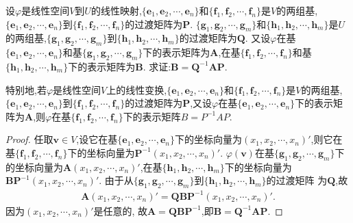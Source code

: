 \documentclass[../../main.tex]{subfiles}%
\begin{document}
\begin{proposition}\label{proposition:线性映射与过渡矩阵}
设\(\varphi\)是线性空间\(V\)到\(U\)的线性映射,\(\{\boldsymbol{e}_1,\boldsymbol{e}_2,\cdots,\boldsymbol{e}_n\}\)和\(\{\boldsymbol{f}_1,\boldsymbol{f}_2,\cdots,\boldsymbol{f}_n\}\)是\(V\)的两组基,\(\{\boldsymbol{e}_1,\boldsymbol{e}_2,\cdots,\boldsymbol{e}_n\}\)到\(\{\boldsymbol{f}_1,\boldsymbol{f}_2,\cdots,\boldsymbol{f}_n\}\)的过渡矩阵为\(\boldsymbol{P}\). \(\{\boldsymbol{g}_1,\boldsymbol{g}_2,\cdots,\boldsymbol{g}_m\}\)和\(\{\boldsymbol{h}_1,\boldsymbol{h}_2,\cdots,\boldsymbol{h}_m\}\)是\(U\)的两组基,\(\{\boldsymbol{g}_1,\boldsymbol{g}_2,\cdots,\boldsymbol{g}_m\}\)到\(\{\boldsymbol{h}_1,\boldsymbol{h}_2,\cdots,\boldsymbol{h}_m\}\)的过渡矩阵为\(\boldsymbol{Q}\). 又设\(\varphi\)在基\(\{\boldsymbol{e}_1,\boldsymbol{e}_2,\cdots,\boldsymbol{e}_n\}\)和基\(\{\boldsymbol{g}_1,\boldsymbol{g}_2,\cdots,\boldsymbol{g}_m\}\)下的表示矩阵为\(\boldsymbol{A}\),在基\(\{\boldsymbol{f}_1,\boldsymbol{f}_2,\cdots,\boldsymbol{f}_n\}\)和基\(\{\boldsymbol{h}_1,\boldsymbol{h}_2,\cdots,\boldsymbol{h}_m\}\)下的表示矩阵为\(\boldsymbol{B}\). 求证:\(\boldsymbol{B}=\boldsymbol{Q}^{-1}\boldsymbol{A}\boldsymbol{P}\).

特别地,若$\varphi$是线性空间$V$上的线性变换,\(\{\boldsymbol{e}_1,\boldsymbol{e}_2,\cdots,\boldsymbol{e}_n\}\)和\(\{\boldsymbol{f}_1,\boldsymbol{f}_2,\cdots,\boldsymbol{f}_n\}\)是\(V\)的两组基,\(\{\boldsymbol{e}_1,\boldsymbol{e}_2,\cdots,\boldsymbol{e}_n\}\)到\(\{\boldsymbol{f}_1,\boldsymbol{f}_2,\cdots,\boldsymbol{f}_n\}\)的过渡矩阵为\(\boldsymbol{P}\),又设\(\varphi\)在基\(\{\boldsymbol{e}_1,\boldsymbol{e}_2,\cdots,\boldsymbol{e}_n\}\)下的表示矩阵为\(\boldsymbol{A}\),则$\varphi$在基\(\{\boldsymbol{f}_1,\boldsymbol{f}_2,\cdots,\boldsymbol{f}_n\}\)下的表示矩阵$B=P^{-1}AP$.
\end{proposition}
\begin{proof}

任取\(\boldsymbol{v}\in V\),设它在基\(\{\boldsymbol{e}_1,\boldsymbol{e}_2,\cdots,\boldsymbol{e}_n\}\)下的坐标向量为\((x_1,x_2,\cdots,x_n)'\),则它在基\(\{\boldsymbol{f}_1,\boldsymbol{f}_2,\cdots,\boldsymbol{f}_n\}\)下的坐标向量为\(\boldsymbol{P}^{-1}(x_1,x_2,\cdots,x_n)'\). \(\varphi(\boldsymbol{v})\)在基\(\{\boldsymbol{g}_1,\boldsymbol{g}_2,\cdots,\boldsymbol{g}_m\}\)下的坐标向量为\(\boldsymbol{A}(x_1,x_2,\cdots,x_n)'\),在基\(\{\boldsymbol{h}_1,\boldsymbol{h}_2,\cdots,\boldsymbol{h}_m\}\)下的坐标向量为\(\boldsymbol{B}\boldsymbol{P}^{-1}(x_1,x_2,\cdots,x_n)'\). 由于从\(\{\boldsymbol{g}_1,\boldsymbol{g}_2,\cdots,\boldsymbol{g}_m\}\)到\(\{\boldsymbol{h}_1,\boldsymbol{h}_2,\cdots,\boldsymbol{h}_m\}\)的过渡矩阵
为\(\boldsymbol{Q}\),故
\begin{align*}
\boldsymbol{A}(x_1,x_2,\cdots,x_n)'=\boldsymbol{Q}\boldsymbol{B}\boldsymbol{P}^{-1}(x_1,x_2,\cdots,x_n)'.  
\end{align*}
因为\((x_1,x_2,\cdots,x_n)'\)是任意的,
故\(\boldsymbol{A}=\boldsymbol{Q}\boldsymbol{B}\boldsymbol{P}^{-1}\),即\(\boldsymbol{B}=\boldsymbol{Q}^{-1}\boldsymbol{A}\boldsymbol{P}\).

\end{proof}
\end{document}
